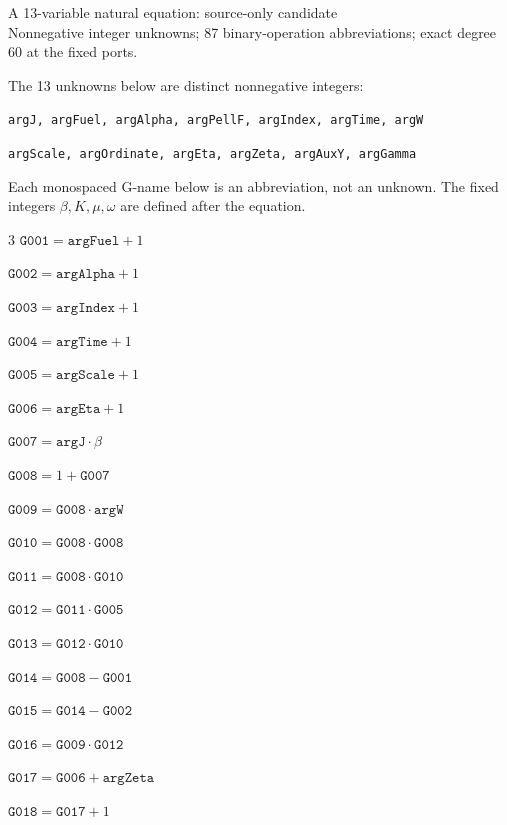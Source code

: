 \documentclass[10pt]{article}
\begin{document}
\begin{center}{\Large A 13-variable natural equation: source-only candidate}\\
Nonnegative integer unknowns; 87 binary-operation abbreviations; exact degree 60 at the fixed ports.
\end{center}
The 13 unknowns below are distinct nonnegative integers:
\par\small
\noindent\texttt{argJ, argFuel, argAlpha, argPellF, argIndex, argTime, argW}\par
\noindent\texttt{argScale, argOrdinate, argEta, argZeta, argAuxY, argGamma}\par
\normalsize
Each monospaced G-name below is an abbreviation, not an unknown. The fixed integers $\beta,K,\mu,\omega$ are defined after the equation.
\begin{multicols}{3}\small
\noindent $\mathtt{G001}=\mathtt{argFuel}+1$\par
\noindent $\mathtt{G002}=\mathtt{argAlpha}+1$\par
\noindent $\mathtt{G003}=\mathtt{argIndex}+1$\par
\noindent $\mathtt{G004}=\mathtt{argTime}+1$\par
\noindent $\mathtt{G005}=\mathtt{argScale}+1$\par
\noindent $\mathtt{G006}=\mathtt{argEta}+1$\par
\noindent $\mathtt{G007}=\mathtt{argJ}\cdot \beta$\par
\noindent $\mathtt{G008}=1+\mathtt{G007}$\par
\noindent $\mathtt{G009}=\mathtt{G008}\cdot \mathtt{argW}$\par
\noindent $\mathtt{G010}=\mathtt{G008}\cdot \mathtt{G008}$\par
\noindent $\mathtt{G011}=\mathtt{G008}\cdot \mathtt{G010}$\par
\noindent $\mathtt{G012}=\mathtt{G011}\cdot \mathtt{G005}$\par
\noindent $\mathtt{G013}=\mathtt{G012}\cdot \mathtt{G010}$\par
\noindent $\mathtt{G014}=\mathtt{G008}-\mathtt{G001}$\par
\noindent $\mathtt{G015}=\mathtt{G014}-\mathtt{G002}$\par
\noindent $\mathtt{G016}=\mathtt{G009}\cdot \mathtt{G012}$\par
\noindent $\mathtt{G017}=\mathtt{G006}+\mathtt{argZeta}$\par
\noindent $\mathtt{G018}=\mathtt{G017}+1$\par

\end{multicols}
\end{document}
